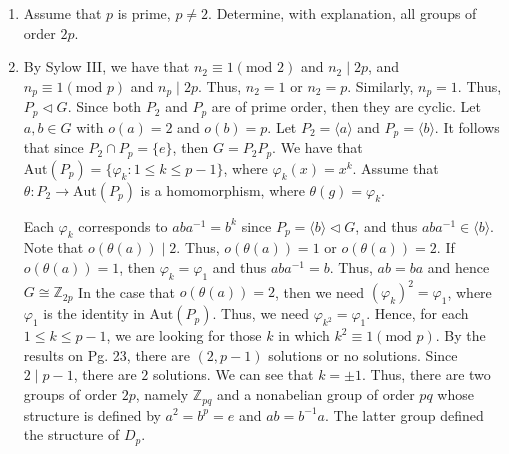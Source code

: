 \documentclass[12pt]{article}
\makeatletter
\theoremstyle{definition}
\theoremstyle{remark}
\renewenvironment{proof}[1][\proofname]{\par
  \pushQED{\qed}%
  \normalfont \topsep6\p@\@plus6\p@\relax
  \list{}{\leftmargin=0mm
          \rightmargin=4mm
          \settowidth{\itemindent}{\itshape#1}%
          \labelwidth=\itemindent
          \parsep=0pt \listparindent=\parindent 
  }
  \item[\hskip\labelsep
        \itshape
    #1\@addpunct{.}]\ignorespaces
}{%
  \popQED\endlist\@endpefalse
}
\let\oldproofname=\proofname
\renewcommand{\proofname}{\bf{\textit{\oldproofname}}}
\makeatother
\begin{document}
\begin{enumerate}[leftmargin=*]
        \item Assume that $p$ is prime, $p\neq 2$. Determine, with explanation, all groups of order $2p$.
            \begin{proof}
                By Sylow III, we have that $n_2\equiv 1(\text{mod }2)$ and $n_2\mid 2p$, and $n_p\equiv 1(\text{mod }p)$ and $n_p\mid 2p$. Thus, $n_2=1$ or $n_2=p$. Similarly, $n_p=1$. Thus, $P_p\triangleleft G$. Since both $P_2$ and $P_p$ are of prime order, then they are cyclic. Let $a,b\in G$ with $o(a)=2$ and $o(b)=p$. Let $P_2=\langle a\rangle$ and $P_p=\langle b\rangle$. It follows that since $P_2\cap P_p=\{e\}$, then $G=P_2P_p$. We have that $\text{Aut}(P_p)=\{\varphi_k\colon 1\leq k\leq p-1\}$, where $\varphi_k(x)=x^k$. Assume that $\theta\colon P_2\rightarrow\text{Aut}(P_p)$ is a homomorphism, where $\theta(g)=\varphi_k$.\par\hspace{4mm} Each $\varphi_k$ corresponds to $aba^{-1}=b^k$ since $P_p=\langle b\rangle\triangleleft G$, and thus $aba^{-1}\in\langle b\rangle$. Note that $o(\theta(a))\mid 2$. Thus, $o(\theta(a))=1$ or $o(\theta(a))=2$. If $o(\theta(a))=1$, then $\varphi_k=\varphi_1$ and thus $aba^{-1}=b$. Thus, $ab=ba$ and hence $G\cong \mathbb{Z}_{2p}$  In the case that $o(\theta(a))=2$, then we need $(\varphi_k)^2=\varphi_1$, where $\varphi_1$ is the identity in $\text{Aut}(P_p)$. Thus, we need $\varphi_{k^2}=\varphi_1$. Hence, for each $1\leq k\leq p-1$, we are looking for those $k$ in which $k^2\equiv 1(\text{mod }p)$. By the results on Pg. 23, there are $(2,p-1)$ solutions or no solutions. Since $2\mid p-1$, there are $2$ solutions. We can see that $k=\pm 1$. Thus, there are two groups of order $2p$, namely $\mathbb{Z}_{pq}$ and a nonabelian group of order $pq$ whose structure is defined by $a^2=b^p=e$ and $ab=b^{-1}a$. The latter group defined the structure of $D_{p}$.  
            \end{proof}
    \end{enumerate}
\end{document}
